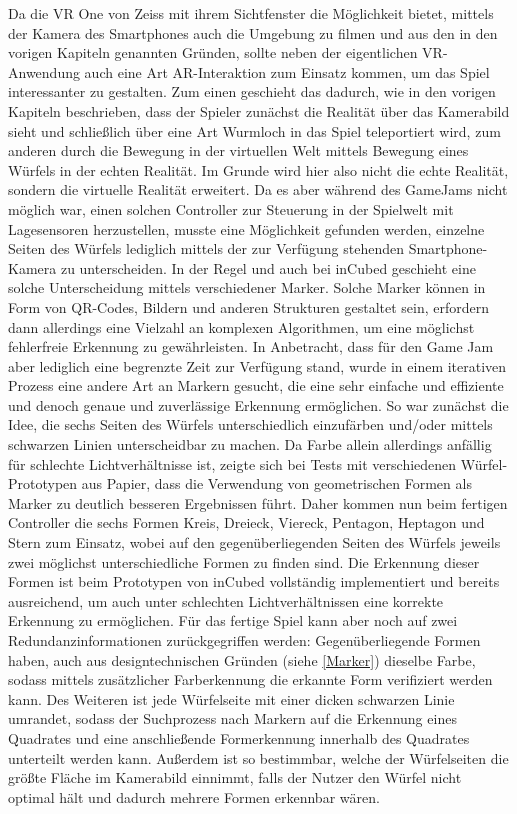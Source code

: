 
Da die VR One von Zeiss mit ihrem Sichtfenster die Möglichkeit bietet, mittels der Kamera des Smartphones auch die Umgebung zu filmen und aus den in den vorigen Kapiteln genannten Gründen, sollte neben der eigentlichen VR-Anwendung auch eine Art AR-Interaktion zum Einsatz kommen, um das Spiel interessanter zu gestalten. Zum einen geschieht das dadurch, wie in den vorigen Kapiteln beschrieben, dass der Spieler zunächst die Realität über das Kamerabild sieht und schließlich über eine Art Wurmloch in das Spiel teleportiert wird, zum anderen durch die Bewegung in der virtuellen Welt mittels Bewegung eines Würfels in der echten Realität. Im Grunde wird hier also nicht die echte Realität, sondern die virtuelle Realität erweitert. Da es aber während des GameJams nicht möglich war, einen solchen Controller zur Steuerung in der Spielwelt mit Lagesensoren herzustellen, musste eine Möglichkeit gefunden werden, einzelne Seiten des Würfels lediglich mittels der zur Verfügung stehenden Smartphone-Kamera zu unterscheiden. In der Regel und auch bei inCubed geschieht eine solche Unterscheidung mittels verschiedener Marker. Solche Marker können in Form von QR-Codes, Bildern und anderen Strukturen gestaltet sein, erfordern dann allerdings eine Vielzahl an komplexen Algorithmen, um eine möglichst fehlerfreie Erkennung zu gewährleisten. In Anbetracht, dass für den Game Jam aber lediglich eine begrenzte Zeit zur Verfügung stand, wurde in einem iterativen Prozess eine andere Art an Markern gesucht, die eine sehr einfache und effiziente und denoch genaue und zuverlässige Erkennung ermöglichen. So war zunächst die Idee, die sechs Seiten des Würfels unterschiedlich einzufärben und/oder mittels schwarzen Linien unterscheidbar zu machen. Da Farbe allein allerdings anfällig für schlechte Lichtverhältnisse ist, zeigte sich bei Tests mit verschiedenen Würfel-Prototypen aus Papier, dass die Verwendung von geometrischen Formen als Marker zu deutlich besseren Ergebnissen führt. Daher kommen nun beim fertigen Controller die sechs Formen Kreis, Dreieck, Viereck, Pentagon, Heptagon und Stern zum Einsatz, wobei auf den gegenüberliegenden Seiten des Würfels jeweils zwei möglichst unterschiedliche Formen zu finden sind. Die Erkennung dieser Formen ist beim Prototypen von inCubed vollständig implementiert und bereits ausreichend, um auch unter schlechten Lichtverhältnissen eine korrekte Erkennung zu ermöglichen. Für das fertige Spiel kann aber noch auf zwei Redundanzinformationen zurückgegriffen werden: Gegenüberliegende Formen haben, auch aus designtechnischen Gründen (siehe \ref{Marker}) dieselbe Farbe, sodass mittels zusätzlicher Farberkennung die erkannte Form verifiziert werden kann. Des Weiteren ist jede Würfelseite mit einer dicken schwarzen Linie umrandet, sodass der Suchprozess nach Markern auf die Erkennung eines Quadrates und eine anschließende Formerkennung innerhalb des Quadrates unterteilt werden kann. Außerdem ist so bestimmbar, welche der Würfelseiten die größte Fläche im Kamerabild einnimmt, falls der Nutzer den Würfel nicht optimal hält und dadurch mehrere Formen erkennbar wären.


